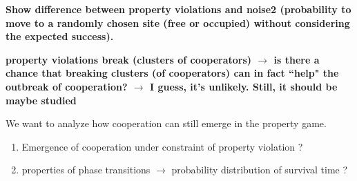 {\bf Show difference between property violations and noise2 (probability to move to a randomly chosen site (free or occupied) without considering the expected success).}

{\bf property violations break (clusters of cooperators) $\rightarrow$ is there a chance that breaking clusters (of cooperators) can in fact ``help" the outbreak of cooperation? $\rightarrow$ I guess, it's unlikely. Still, it should be maybe studied}



We want to analyze how cooperation can still emerge in the property game.

\begin{enumerate}
  \item Emergence of cooperation under constraint of property violation ?
  \item properties of phase transitions $\rightarrow$ probability distribution of survival time ?
\end{enumerate}



